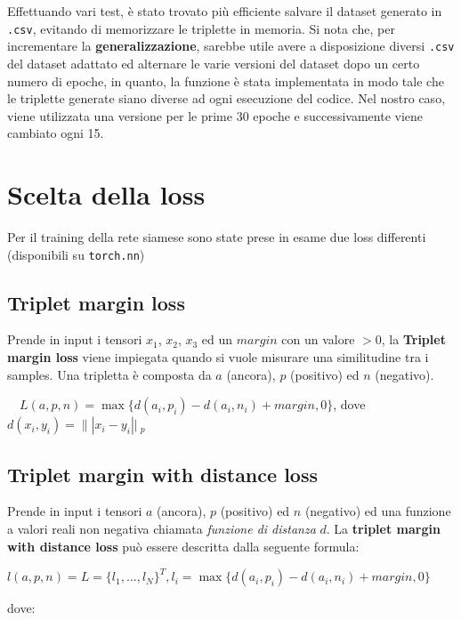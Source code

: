 \documentclass[11pt]{article}
\begin{document}
Effettuando vari test, è stato trovato più efficiente salvare il dataset generato in
\texttt{.csv}, evitando di memorizzare le triplette in memoria. Si nota che, per incrementare
la \textbf{generalizzazione}, sarebbe utile avere a disposizione diversi
\texttt{.csv} del dataset adattato ed alternare le varie versioni del dataset dopo un certo numero di epoche, 
in quanto, la funzione è stata implementata in modo tale che le triplette generate siano diverse ad ogni esecuzione del codice. Nel nostro caso, viene utilizzata
una versione per le prime 30 epoche e successivamente viene cambiato ogni 15.

\pagebreak
\section{Scelta della loss}

Per il training della rete siamese sono state prese in esame due loss differenti (disponibili su \texttt{torch.nn})

\subsection{Triplet margin loss}
Prende in input i tensori $x_1$, $x_2$, $x_3$ ed un $margin$ con un valore $> 0$,
la \textbf{Triplet margin loss} viene impiegata quando si vuole misurare una similitudine tra i samples.
Una tripletta è composta da $a$ (ancora), $p$ (positivo) ed $n$ (negativo). 
\begin{center}
    \ \
    $L(a,p,n) = \max{ \{ d(a_i, p_i) - d(a_i, n_i) + margin, 0 \} }$, dove \ \
    \\
    $d(x_i, y_i) = \|| x_i - y_i ||\ _p$
    \ \
\end{center}

\subsection{Triplet margin with distance loss}
Prende in input i tensori $a$ (ancora), $p$ (positivo) ed $n$ (negativo) ed una funzione a valori
reali non negativa chiamata \textit{funzione di distanza} $d$.
La \textbf{triplet margin with distance loss} può essere descritta dalla seguente formula:

\begin{center}
    $l(a,p,n) = L = { \{ l_1, \ldots, l_N \}}^T, l_i = \max{\{ d(a_i, p_i) - d(a_i, n_i) + margin, 0 \}} $
\end{center}

dove:
\end{document}
